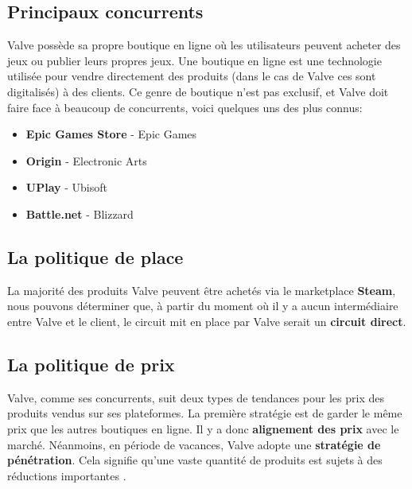\documentclass[12pt]{article}
\begin{document}
    \newpage
	\subsection{Principaux concurrents}
	Valve possède sa propre boutique en ligne où les utilisateurs peuvent acheter des jeux ou publier leurs propres jeux. Une boutique en ligne est une technologie utilisée pour vendre directement des produits (dans le cas de Valve ces sont digitalisés) à des clients. Ce genre de boutique n'est pas exclusif, et Valve doit faire face à beaucoup de concurrents, voici quelques uns des plus connus:
	\begin{itemize}
		\item \textbf{Epic Games Store} - Epic Games
		\item \textbf{Origin} - Electronic Arts
		\item \textbf{UPlay} - Ubisoft
		\item \textbf{Battle.net} - Blizzard
	\end{itemize}

    \subsection{La politique de place}
    La majorité des produits Valve peuvent être achetés via le marketplace \textbf{Steam}, nous pouvons déterminer que, à partir du moment où il y a aucun intermédiaire entre Valve et le client, le circuit mit en place par Valve serait un \textbf{circuit direct}.

    \subsection{La politique de prix}
    Valve, comme ses concurrents, suit deux types de tendances pour les prix des produits vendus sur ses plateformes. La première stratégie est de garder le même prix que les autres boutiques en ligne. Il y a donc \textbf{alignement des prix} avec le marché. Néanmoins, en période de vacances, Valve adopte une \textbf{stratégie de pénétration}. Cela signifie qu'une vaste quantité de produits est sujets à des réductions importantes \cite{valve_discout}.

	\newpage
\end{document}

